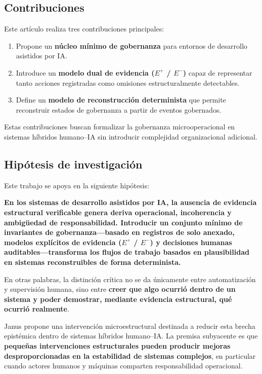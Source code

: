 \documentclass[conference]{IEEEtran}
\begin{document}
\subsection{Contribuciones}
Este artículo realiza tres contribuciones principales:
\begin{enumerate}
  \item Propone un \textbf{núcleo mínimo de gobernanza} para entornos de desarrollo asistidos por IA.
  \item Introduce un \textbf{modelo dual de evidencia ($E^{+}$ / $E^{-}$)} capaz de representar tanto acciones registradas como omisiones estructuralmente detectables.
  \item Define un \textbf{modelo de reconstrucción determinista} que permite reconstruir estados de gobernanza a partir de eventos gobernados.
\end{enumerate}
Estas contribuciones buscan formalizar la gobernanza microoperacional en sistemas híbridos humano--IA sin introducir complejidad organizacional adicional.

\subsection{Hipótesis de investigación}
Este trabajo se apoya en la siguiente hipótesis:

\textbf{En los sistemas de desarrollo asistidos por IA, la ausencia de evidencia estructural verificable genera deriva operacional, incoherencia y ambigüedad de responsabilidad. Introducir un conjunto mínimo de invariantes de gobernanza---basado en registros de solo anexado, modelos explícitos de evidencia ($E^{+}$ / $E^{-}$) y decisiones humanas auditables---transforma los flujos de trabajo basados en plausibilidad en sistemas reconstruibles de forma determinista.}

En otras palabras, la distinción crítica no se da únicamente entre automatización y supervisión humana, sino entre \textbf{creer que algo ocurrió dentro de un sistema y poder demostrar, mediante evidencia estructural, qué ocurrió realmente}.

Janus propone una intervención microestructural destinada a reducir esta brecha epistémica dentro de sistemas híbridos humano--IA. La premisa subyacente es que \textbf{pequeñas intervenciones estructurales pueden producir mejoras desproporcionadas en la estabilidad de sistemas complejos}, en particular cuando actores humanos y máquinas comparten responsabilidad operacional.
\end{document}

